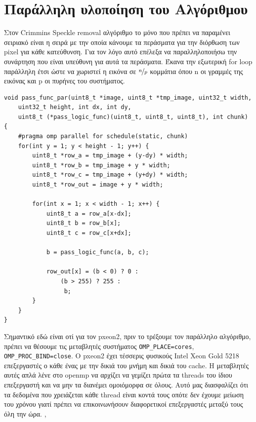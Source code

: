 \section{Παράλληλη υλοποίηση του Αλγόριθμου}

Στον Crimmins Speckle removal αλγόριθμο το μόνο που πρέπει να παραμένει σειριακό είναι η σειρά με την οποία κάνουμε τα περάσματα για την διόρθωση των pixel για κάθε κατεύθυνση. Για τον λόγο αυτό επέλεξα να παραλληλοποιήσω την συνάρτηση που είναι υπεύθυνη για αυτά τα περάσματα. Έκανα την εξωτερική for loop παράλληλη έτσι ώστε να χωριστεί η εικόνα σε $\nicefrac{\Large n}{\Large p}$ κομμάτια όπου n οι γραμμές της εικόνας και p οι πυρήνες του συστήματος.

\begin{verbatim}
void pass_func_par(uint8_t *image, uint8_t *tmp_image, uint32_t width,
    uint32_t height, int dx, int dy,
    uint8_t (*pass_logic_func)(uint8_t, uint8_t, uint8_t), int chunk)
{
    #pragma omp parallel for schedule(static, chunk)
    for(int y = 1; y < height - 1; y++) {
        uint8_t *row_a = tmp_image + (y-dy) * width;
        uint8_t *row_b = tmp_image + y * width;
        uint8_t *row_c = tmp_image + (y+dy) * width;
        uint8_t *row_out = image + y * width;

        for(int x = 1; x < width - 1; x++) {
            uint8_t a = row_a[x-dx];
            uint8_t b = row_b[x];
            uint8_t c = row_c[x+dx];

            b = pass_logic_func(a, b, c);

            row_out[x] = (b < 0) ? 0 :
                (b > 255) ? 255 :
                 b;
        }
    }
}
\end{verbatim}

Σημαντικό εδώ είναι οτί για τον pxeon2, πριν το τρέξουμε τον παράλληλο αλγόριθμο, πρέπει να θέσουμε τις μεταβλητές συστήματος \verb|OMP_PLACE=cores|, \verb|OMP_PROC_BIND=close|. Ο pxeon2 έχει τέσσερις φυσικούς Intel Xeon Gold 5218 επεξεργαστές ο κάθε ένας με την δικιά του μνήμη και δικιά του cache. Η μεταβλητές αυτές απλά λένε στο openmp να αρχίζει να γεμίζει πρώτα τα threads του ίδιου επεξεργαστή και να μην τα διανέμει ομοιόμορφα σε όλους. Αυτό μας διασφαλίζει ότι τα δεδομένα που χρειάζεται κάθε thread είναι κοντά τους οπότε δεν έχουμε μείωση του χρόνου γιατί πρέπει να επικοινωνήσουν διαφορετικοί επεξεργαστές μεταξύ τους όλη την ώρα. \cite{klemm2023advanced}, \cite{vanderpas2021numa}\\

